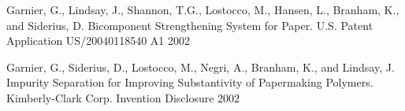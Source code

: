 Garnier, G., Lindsay, J., Shannon, T.G., Lostocco, M., Hansen, L., Branham, K., and Siderius, D. Bicomponent Strengthening System for Paper. U.S. Patent Application US/20040118540 A1 2002

Garnier, G., Siderius, D., Lostocco, M., Negri, A., Branham, K., and Lindsay, J. Impurity Separation for Improving Substantivity of Papermaking Polymers. Kimberly-Clark Corp. Invention Disclosure 2002
